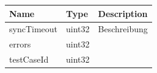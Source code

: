 \begin{par}

\end{par}


\begin{tabular}[ht]{|l|l|p{8cm}|}
\hline
\textbf{Name} & \textbf{Type} & \textbf{Description}\\
\hline
syncTimeout & uint32 & %
Beschreibung
\\
\hline
errors & uint32 & \\
\hline
testCaseId & uint32 & \\
\hline
\end{tabular}

